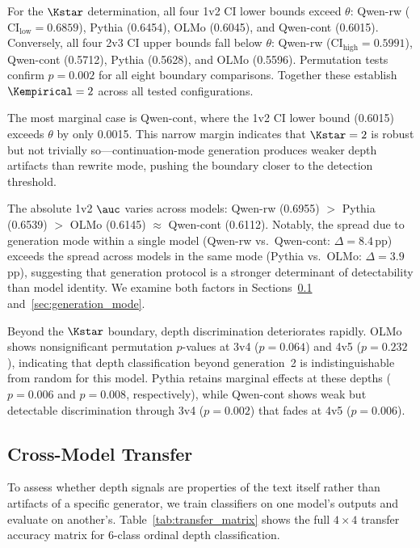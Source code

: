For the $\Kstar$ determination, all four 1v2 CI lower bounds exceed
$\theta$: Qwen-rw ($\text{CI}_\text{low} = 0.6859$), Pythia (0.6454),
OLMo (0.6045), and Qwen-cont (0.6015).
Conversely, all four 2v3 CI upper bounds fall below $\theta$:
Qwen-rw ($\text{CI}_\text{high} = 0.5991$), Qwen-cont (0.5712),
Pythia (0.5628), and OLMo (0.5596).
Permutation tests confirm $p = 0.002$ for all eight boundary comparisons.
Together these establish $\Kempirical = 2$ across all tested configurations.

The most marginal case is Qwen-cont, where the 1v2 CI lower bound
(0.6015) exceeds $\theta$ by only 0.0015.  This narrow margin
indicates that $\Kstar = 2$ is robust but not trivially so---continuation-mode
generation produces weaker depth artifacts than rewrite mode, pushing the
boundary closer to the detection threshold.

The absolute 1v2 $\auc$ varies across models:
Qwen-rw (0.6955) $>$ Pythia (0.6539) $>$ OLMo (0.6145) $\approx$ Qwen-cont (0.6112).
Notably, the spread due to generation mode within a single model
(Qwen-rw vs.\ Qwen-cont: $\Delta = 8.4$\,pp) exceeds the spread
across models in the same mode
(Pythia vs.\ OLMo: $\Delta = 3.9$\,pp),
suggesting that generation protocol is a stronger determinant
of detectability than model identity.
We examine both factors in Sections~\ref{sec:transfer}
and~\ref{sec:generation_mode}.

Beyond the $\Kstar$ boundary, depth discrimination deteriorates
rapidly.
OLMo shows nonsignificant permutation $p$-values at 3v4
($p = 0.064$) and 4v5 ($p = 0.232$), indicating that depth
classification beyond generation~2 is indistinguishable from
random for this model.
Pythia retains marginal effects at these depths
($p = 0.006$ and $p = 0.008$, respectively),
while Qwen-cont shows weak but detectable discrimination through
3v4 ($p = 0.002$) that fades at 4v5 ($p = 0.006$).

\subsection{Cross-Model Transfer}
\label{sec:transfer}

To assess whether depth signals are properties of the text itself
rather than artifacts of a specific generator, we train classifiers
on one model's outputs and evaluate on another's.
Table~\ref{tab:transfer_matrix} shows the full
$4 \times 4$ transfer accuracy matrix for 6-class ordinal depth
classification.

